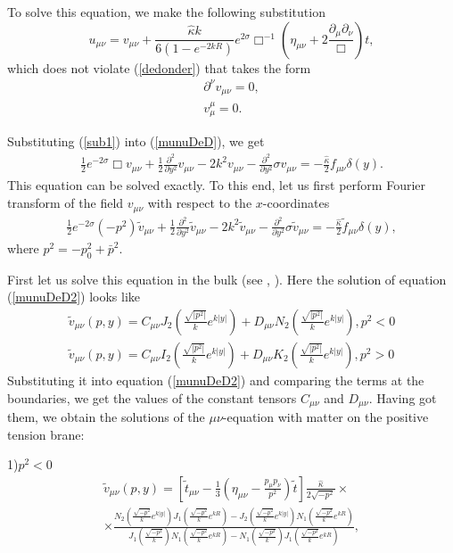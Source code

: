 \documentclass[a4paper,12pt]{article}
\begin{document}
To solve this equation, we make the following substitution
\begin{equation}\label{sub1}
u_{\mu\nu}=v_{\mu\nu}+\frac{\hat\kappa
k}{6(1-e^{-2kR})}e^{2\sigma}\Box^{-1}\left(\eta_{\mu\nu}+
2\frac{\partial_\mu\partial_\nu}{\Box}\right)t,
\end{equation}
which does not violate (\ref{dedonder}) that takes the form
\begin{eqnarray}\label{dedonder1}
\partial^\nu v_{\mu\nu}=0, \\ \nonumber
v_\mu^\mu=0.
\end{eqnarray}

Substituting (\ref{sub1}) into (\ref{munuDeD}), we get
\begin{eqnarray}\label{munuDeD1}
\frac{1}{2}e^{-2\sigma}\Box v_{\mu\nu}+\frac{1}{2} \frac{\partial^2}{
\partial y^2} v_{\mu\nu}-2k^2v_{\mu\nu}- \frac{\partial^2}{ \partial
y^2}\sigma v_{\mu\nu}= -\frac{\hat\kappa}{2}f_{\mu\nu}\delta(y).
\end{eqnarray}
This equation can be solved  exactly. To  this end, let us first
perform Fourier transform of the field $v_{\mu\nu}$ with respect
to the $x$-coordinates
\begin{eqnarray}\label{munuDeD2}
\frac{1}{2}e^{-2\sigma}(-p^2) \tilde
v_{\mu\nu}+\frac{1}{2}\frac{\partial^2}{ \partial y^2}\tilde
v_{\mu\nu}-2k^2\tilde v_{\mu\nu}-\frac{\partial^2}{ \partial y^2}\sigma
\tilde v_{\mu\nu}=-\frac{\hat\kappa}{2}\tilde f_{\mu\nu}\delta(y),
\end{eqnarray}
where $p^2=-p_{0}^{2}+\bar p^2$.

First let us solve this equation in the bulk (see \cite{BKSV},
\cite{RS2}). Here the solution of equation (\ref{munuDeD2})
looks like
\begin{eqnarray}
\tilde
v_{\mu\nu}(p,y)=C_{\mu\nu}J_2\left(\frac{\sqrt{|p^2|}}{k}e^{k|y|}\right)+
D_{\mu\nu}N_2\left(\frac{\sqrt{|p^2|}}{k}e^{k|y|}\right), p^2<0 \\
\tilde
v_{\mu\nu}(p,y)=C_{\mu\nu}I_2\left(\frac{\sqrt{|p^2|}}{k}e^{k|y|}\right)+
D_{\mu\nu}K_2\left(\frac{\sqrt{|p^2|}}{k}e^{k|y|}\right), p^2>0
\end{eqnarray}
Substituting it into  equation (\ref{munuDeD2}) and comparing the
terms at the boundaries, we get the values of the constant tensors
$C_{\mu\nu}$ and $D_{\mu\nu}$. Having got them, we obtain the
solutions of the $\mu\nu$-equation with matter on the
positive tension brane:

1)$p^2<0$
\begin{eqnarray}
\tilde v_{\mu\nu}(p,y)= \left[\tilde
t_{\mu\nu}-\frac{1}{3}\left(\eta_{\mu\nu}-
\frac{p_{\mu}p_{\nu}}{p^2}\right)\tilde t \right]
\frac{\hat\kappa}{2\sqrt{-p^2}}\times \\ \nonumber \times
\frac{N_2\left(\frac{\sqrt{-p^2}}{k}e^{k|y|}\right)
J_1\left(\frac{\sqrt{-p^2}}{k}e^{kR}\right)-J_2\left(\frac{\sqrt{-p^2}}{k}e^{k|y|}\right)
N_1\left(\frac{\sqrt{-p^2}}{k}e^{kR}\right)}{J_1\left(\frac{\sqrt{-p^2}}{k}\right)
N_1\left(\frac{\sqrt{-p^2}}{k}e^{kR}\right)-N_1\left(\frac{\sqrt{-p^2}}{k}\right)
J_1\left(\frac{\sqrt{-p^2}}{k}e^{kR}\right)},
\end{eqnarray}
\end{document}
